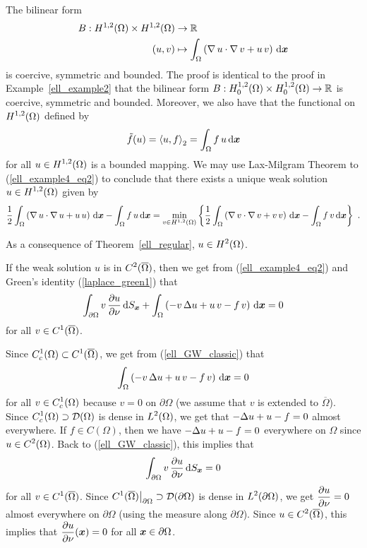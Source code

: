 \begin{egg}
The bilinear form
\begin{align*}
B:H^{1,2}(\Omega)\times H^{1,2}(\Omega) &\rightarrow \mathbb{R} \\
(u,v) &\mapsto \int_\Omega \left( \operatorname{\nabla} u \cdot \operatorname{\nabla} v + u\, v\right)
\,\mathrm{d}{{\bm{x}}}
\end{align*}
is coercive, symmetric and bounded.  The proof is identical to the
proof in Example~\ref{ell_example2} that the bilinear form
$\displaystyle B:H^{1,2}_0(\Omega)\times H^{1,2}_0(\Omega) \rightarrow \mathbb{R}$
is coercive, symmetric and bounded.  Moreover, we also have that the
functional on $\displaystyle H^{1,2}(\Omega)$ defined by 
\[
\tilde{f}(u) = \left\langle{u} , {f}\right\rangle_2 = \int_\Omega f\, u\,\mathrm{d}{{\bm{x}}}
\]
for all $\displaystyle u \in H^{1,2}(\Omega)$ is a bounded mapping.
We may use Lax-Milgram Theorem to
(\ref{ell_example4_eq2}) to conclude that there exists a unique weak
solution $\displaystyle u \in H^{1,2}(\Omega)$ given by
\[
\frac{1}{2} \int_\Omega \left( \graD u \cdot \graD u 
+u\, u \right) \dx{\VEC{x}} -\int_\Omega f\, u \dx{\VEC{x}}
= \min_{v\in H^{1,2}(\Omega)} \left\{ \frac{1}{2}
\int_\Omega \left( \graD v \cdot \graD v 
+v\, v \right) \dx{\VEC{x}} -\int_\Omega f\, v \dx{\VEC{x}} \right\} \ .
\]

As a consequence of Theorem~\ref{ell_regular}, $\displaystyle u\in H^2(\Omega)$.

If the weak solution $u$ is in $\displaystyle C^2(\overline{\Omega})$,
then we get from (\ref{ell_example4_eq2}) and Green's identity
(\ref{laplace_green1}) that
\begin{equation} \label{ell_GW_classic}
\int_{\partial \Omega} v\,\frac{\partial{u}}{\partial \nu} \,\mathrm{d}{S}_{{\bm{x}}}
+ \int_\Omega \left( - v\, \Delta u + u\, v - f\, v \right) \,\mathrm{d}{{\bm{x}}} = 0
\end{equation}
for all $\displaystyle v \in C^1(\overline{\Omega})$.

Since $\displaystyle C^1_c(\Omega) \subset C^1(\overline{\Omega})$, we get from
(\ref{ell_GW_classic}) that
\[
\int_\Omega \left( - v\, \Delta u + u\, v - f\, v \right) \,\mathrm{d}{{\bm{x}}} = 0
\]
for all $\displaystyle v \in C^1_c(\Omega)$ 
because $v=0$ on $\partial \Omega$ (we assume that $v$ is extended to
$\overline{\Omega}$).  Since $\displaystyle C^1_c(\Omega)
\supset \mathcal{D}(\Omega)$ is dense in
$\displaystyle L^2(\Omega)$, we get that
$\displaystyle -\Delta u + u - f = 0$ almost
everywhere.  If $f \in C(\Omega)$, then we have
$\displaystyle -\Delta u + u -f = 0$ everywhere on $\Omega$ since
$\displaystyle u\in C^2(\Omega)$.  Back to (\ref{ell_GW_classic}),
this implies that
\[
\int_{\partial \Omega} v\,\frac{\partial{u}}{\partial \nu} \,\mathrm{d}{S}_{{\bm{x}}} = 0
\]
for all $\displaystyle v \in C^1(\overline{\Omega})$.
Since $\displaystyle C^1(\overline{\Omega})\big|_{\partial \Omega}
\supset \mathcal{D}(\partial \Omega)$ is dense in $\displaystyle L^2(\partial \Omega)$,
we get $\displaystyle \frac{\partial{u}}{\partial \nu} =0$ almost everywhere on
$\partial \Omega$ (using the measure along $\partial \Omega$).  Since
$\displaystyle u\in C^2(\overline{\Omega})$, this implies that
$\displaystyle \frac{\partial{u}}{\partial \nu}({\bm{x}}) =0$ for all
${\bm{x}} \in \partial \Omega$.
\end{egg}

